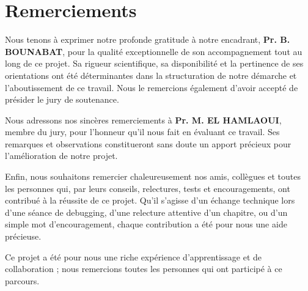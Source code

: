 \chapter*{Remerciements}

\noindent Nous tenons à exprimer notre profonde gratitude à notre encadrant, \textbf{Pr. B. BOUNABAT}, pour la qualité exceptionnelle de son accompagnement tout au long de ce projet. Sa rigueur scientifique, sa disponibilité et la pertinence de ses orientations ont été déterminantes dans la structuration de notre démarche et l'aboutissement de ce travail. Nous le remercions également d'avoir accepté de présider le jury de soutenance.

\vspace{0.5cm}
\noindent Nous adressons nos sincères remerciements à \textbf{Pr. M. EL HAMLAOUI}, membre du jury, pour l'honneur qu'il nous fait en évaluant ce travail. Ses remarques et observations constitueront sans doute un apport précieux pour l'amélioration de notre projet.

\vspace{0.5cm}
\noindent Enfin, nous souhaitons remercier chaleureusement nos amis, collègues et toutes les personnes qui, par leurs conseils, relectures, tests et encouragements, ont contribué à la réussite de ce projet. Qu'il s'agisse d'un échange technique lors d'une séance de debugging, d'une relecture attentive d'un chapitre, ou d'un simple mot d'encouragement, chaque contribution a été pour nous une aide précieuse.

\vspace{0.5cm}
\noindent Ce projet a été pour nous une riche expérience d'apprentissage et de collaboration ; nous remercions toutes les personnes qui ont participé à ce parcours.
